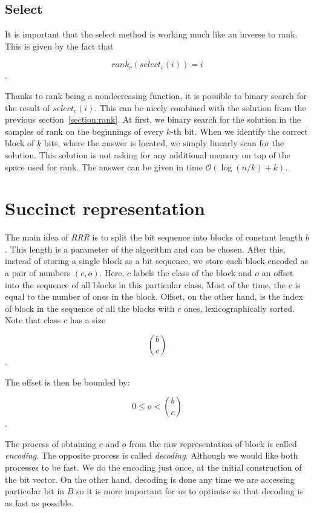 \subsection{Select}
\label{section:select}

It is important that the select method is working much like an inverse to rank. This is given
by the fact that

                $$rank_c(select_c(i)) = i$$.

Thanks to rank being a nondecreasing function, it is possible to binary search for the result
of $select_c(i)$. This can be nicely combined with the solution from the previous
section~\ref{section:rank}. At first, we binary search for the solution in the samples of rank
on the beginnings of every $k$-th bit. When we identify the correct block of $k$ bits, where
the answer is located, we simply linearly scan for the solution. This solution is not asking
for any additional memory on top of the space used for rank. The answer can be given in time
$\mathcal{O}(\log(n/k)+k)$.

\section{Succinct representation}

The main idea of \textit{RRR} is to split the bit sequence into blocks of constant length $b$.
This length is a parameter of the algorithm and can be chosen. After this, instead
of storing a single block as a bit sequence, we store each block encoded as a pair
of numbers $(c, o)$. Here, $c$ labels the class of the block and $o$ an offset into
the sequence of all blocks in this particular class. Most of the time, the $c$ is equal
to the number of ones in the block. Offset, on the other hand, is the index of block in
the sequence of all the blocks with $c$ ones, lexicographically sorted. Note that
class $c$ has a size

                $${b\choose c}$$.

The offset is then be bounded by:

				$$0 \leq o < {b\choose c}$$.

The process of obtaining $c$ and $o$ from the raw representation of block is called
\textit{encoding}. The opposite process is called \textit{decoding}. Although we would
like both processes to be fast. We do the encoding just once, at the initial construction
of the bit vector. On the other hand, decoding is done any time we are accessing particular
bit in $B$ so it is more important for us to optimise so that decoding is as fast as possible.

